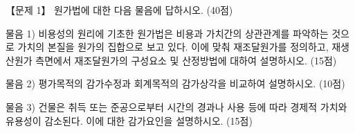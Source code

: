 \begin{longquestion}{【문제 1】}
원가법에 대한 다음 물음에 답하시오. (40점) \par
\medskip\noindent 물음 1) 비용성의 원리에 기초한 원가법은 비용과 가치간의 상관관계를 파악하는 것으로 가치의 본질을 원가의 집합으로 보고 있다. 이에 맞춰 재조달원가를 정의하고, 재생산원가 측면에서 재조달원가의 구성요소 및 산정방법에 대하여 설명하시오. (15점) \par
\medskip\noindent 물음 2) 평가목적의 감가수정과 회계목적의 감가상각을 비교하여 설명하시오. (10점) \par
\medskip\noindent 물음 3) 건물은 취득 또는 준공으로부터 시간의 경과나 사용 등에 따라 경제적 가치와 유용성이 감소된다. 이에 대한 감가요인을 설명하시오. (15점) \par
\end{longquestion}
